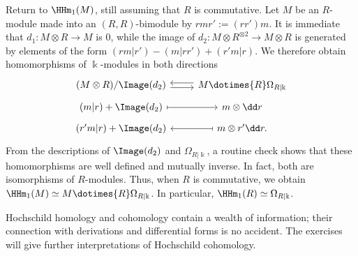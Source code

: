 \begin{example}
	Return to $\HHm_1(M)$, still assuming that $R$ is commutative. Let $M$ be
	an $R$-module made into an $(R,R)$-bimodule by $rmr':=(rr')m$. It is
	immediate that $d_1:M\otimes R\to M$ is $0$, while the image of
	$d_2:M\otimes R^{\otimes2}\to M\otimes R$ is generated by elements of
	the form $(rm|r')-(m|rr')+(r'm|r)$. We therefore obtain homomorphisms of
	$\Bbbk$-modules in both directions
	\[\begin{tikzcd}[row sep=tiny]
		(M \otimes R) / \Image(d_2) \arrow[shift right, r]
		& M \dotimes{R} \Omega_{R|\Bbbk} \arrow[shift right, l] \\
		(m|r) + \Image(d_2) \arrow[mapsto, r] & m \otimes \dd r \\
		(r'm|r) + \Image(d_2)
		& m \otimes r' \dd r \arrow[mapsto, l] .
	\end{tikzcd}\]
	From the descriptions of $\Image(d_2)$ and $\Omega_{R|\Bbbk}$, a routine
	check shows that these homomorphisms are well defined and mutually
	inverse. In fact, both are isomorphisms of $R$-modules. Thus, when $R$ is
	commutative, we obtain
	$\HHm_1(M)\simeq M\dotimes{R}\Omega_{R|\Bbbk}$. In particular,
	$\HHm_1(R)\simeq\Omega_{R|\Bbbk}$.
\end{example}

Hochschild homology and cohomology contain a wealth of information; their
connection with derivations and differential forms is no accident. The
exercises will give further interpretations of Hochschild cohomology.

